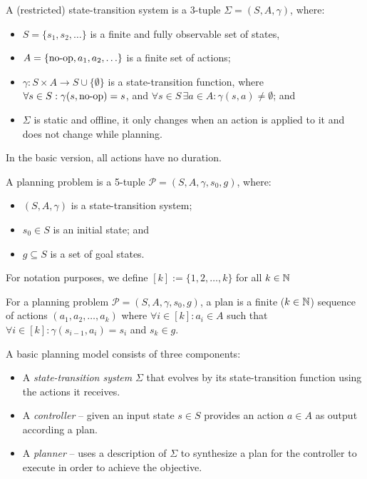 \begin{defn}\label{defn:state-transition-sys}
A (restricted) state-transition system is a 3-tuple $\Sigma = (S, A, \gamma)$, where:
\begin{itemize}
\item $S = \{s_1, s_2, \ldots\}$ is a finite and fully observable set of states,
\item $A = \{\operatorname{\textrm{no-op}}, a_1, a_2, \ldots\}$ is a finite set of actions;
\item $\gamma: S \times A \to S \cup \{\emptyset\}$ is a state-transition function,
where $\forall s \in S : \gamma(s, \operatorname{\textrm{no-op}}) = s$,
and $\forall s \in S\,\exists a \in A : \gamma(s, a) \neq \emptyset$; and
\item $\Sigma$ is static and offline,
it only changes when an action is applied to it and does not change while planning.
\end{itemize}
In the basic version, all actions have no duration.
\end{defn}

\noindent {}

\begin{defn}\label{defn:planning-problem}\cite[Part~I]{Ghallab2004}
A planning problem is a 5-tuple $\mathcal{P} = (S, A, \gamma, s_0, g)$, where:
\begin{itemize}
\item $(S, A, \gamma)$ is a state-transition system;
\item $s_0 \in S$ is an initial state; and
\item $g \subseteq S$ is a set of goal states.
\end{itemize}
\end{defn}

\noindent For notation purposes, we define $[k] := \{1, 2, \ldots, k\}$ for all $k \in \mathbb{N}$

\begin{defn}[Plan]\label{defn:plan}\cite[Section~1.5]{Ghallab2004}
For a planning problem $\mathcal{P} = (S, A, \gamma, s_0, g)$,
a plan is a finite ($k \in \mathbb{N}$) sequence of actions $(a_1, a_2, \ldots, a_k)$ where
$\forall i \in [k] : a_i \in A$ such that
$\forall i \in [k] : \gamma(s_{i-1}, a_i) = s_i$ and $s_k \in g$.
\end{defn}

\noindent A basic planning model consists of three components:

\begin{itemize}
\item A \textit{state-transition system} $\Sigma$ that evolves by its state-transition function using the actions
it receives.
\item A \textit{controller} -- given an input state $s \in S$ provides an action $a \in A$ as output according
a plan.
\item A \textit{planner} -- uses a description of $\Sigma$ to synthesize a plan for the controller
to execute in order to achieve the objective.
\end{itemize}

